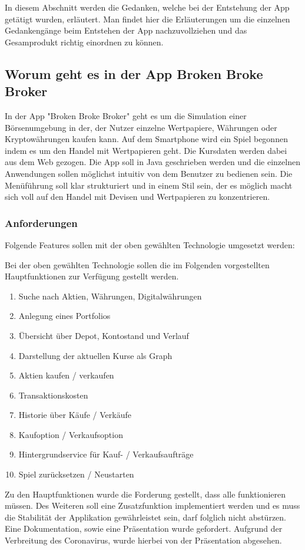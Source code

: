 \documentclass[10pt]{scrartcl}
\begin{document}
In diesem Abschnitt werden die Gedanken, welche bei der Entstehung der App getätigt wurden, erläutert. Man findet hier die Erläuterungen um die einzelnen Gedankengänge beim Entstehen der App nachzuvollziehen und das Gesamprodukt richtig einordnen zu können.

\subsection{Worum geht es in der App Broken Broke Broker}
In der App "Broken Broke Broker" geht es um die Simulation einer Börsenumgebung in der, der Nutzer einzelne Wertpapiere, Währungen oder Kryptowährungen kaufen kann. Auf dem Smartphone wird ein Spiel begonnen indem es um den Handel mit Wertpapieren geht. Die Kursdaten werden dabei aus dem Web gezogen. Die App soll in Java geschrieben werden und die einzelnen Anwendungen sollen möglichst intuitiv von dem Benutzer zu bedienen sein. Die Menüführung soll klar strukturiert und in einem Stil sein, der es möglich macht sich voll auf den Handel mit Devisen und Wertpapieren zu konzentrieren.

\subsubsection{Anforderungen}
Folgende Features sollen mit der oben gewählten Technologie umgesetzt werden:

Bei der oben gewählten Technologie sollen die im Folgenden vorgestellten Hauptfunktionen zur Verfügung gestellt werden.

\begin{enumerate}
	\item 
	Suche nach Aktien, Währungen, Digitalwährungen
	\item
	Anlegung eines Portfolios
	\item
	Übersicht über Depot, Kontostand und Verlauf
	\item
	Darstellung der aktuellen Kurse als Graph
	\item
	Aktien kaufen / verkaufen
	\item
	Transaktionskosten
	\item
	Historie über Käufe / Verkäufe
	\item
	Kaufoption / Verkaufsoption
	\item
	Hintergrundservice für Kauf- / Verkaufsaufträge
	\item
	Spiel zurücksetzen / Neustarten
\end{enumerate}

Zu den Hauptfunktionen wurde die Forderung gestellt, dass alle funktionieren müssen. Des Weiteren soll eine Zusatzfunktion implementiert werden und es muss die Stabilität der Applikation gewährleistet sein, darf folglich nicht abstürzen. Eine Dokumentation, sowie eine Präsentation wurde gefordert. Aufgrund der Verbreitung des Coronavirus, wurde hierbei von der Präsentation abgesehen.
\end{document}
